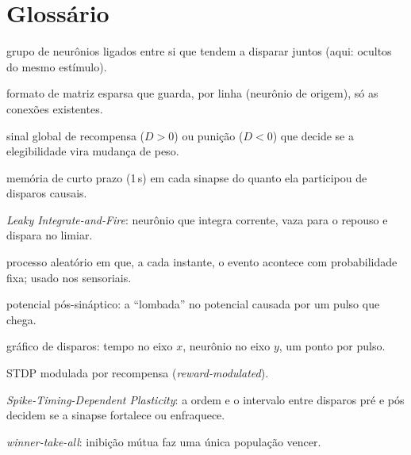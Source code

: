 \documentclass[11pt,a4paper]{article}
\begin{document}
\section{Glossário}
\begin{description}[leftmargin=0pt,itemsep=3pt]
  \item[Assembleia] grupo de neurônios ligados entre si que tendem a disparar juntos (aqui: ocultos do mesmo estímulo).
  \item[CSR] formato de matriz esparsa que guarda, por linha (neurônio de origem), só as conexões existentes.
  \item[Dopamina] sinal global de recompensa ($D>0$) ou punição ($D<0$) que decide se a elegibilidade vira mudança de peso.
  \item[Elegibilidade] memória de curto prazo (1\,s) em cada sinapse do quanto ela participou de disparos causais.
  \item[LIF] \emph{Leaky Integrate-and-Fire}: neurônio que integra corrente, vaza para o repouso e dispara no limiar.
  \item[Poisson] processo aleatório em que, a cada instante, o evento acontece com probabilidade fixa; usado nos sensoriais.
  \item[PSP] potencial pós-sináptico: a “lombada” no potencial causada por um pulso que chega.
  \item[Raster] gráfico de disparos: tempo no eixo $x$, neurônio no eixo $y$, um ponto por pulso.
  \item[R-STDP] STDP modulada por recompensa (\emph{reward-modulated}).
  \item[STDP] \emph{Spike-Timing-Dependent Plasticity}: a ordem e o intervalo entre disparos pré e pós decidem se a sinapse fortalece ou enfraquece.
  \item[WTA] \emph{winner-take-all}: inibição mútua faz uma única população vencer.
\end{description}
\end{document}
